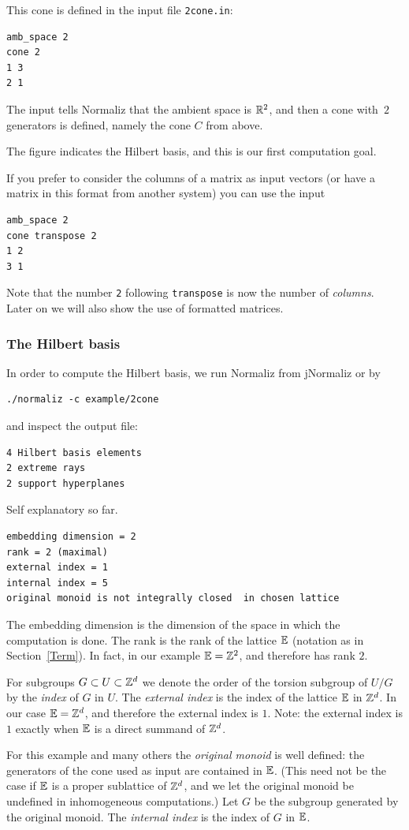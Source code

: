 This cone is defined in the input file \verb|2cone.in|:
\begin{Verbatim}
amb_space 2
cone 2
1 3
2 1
\end{Verbatim}
The input tells Normaliz that the ambient space is ${\mathbb R}^2$, and then a cone with~$2$ generators is defined, namely the cone $C$ from above.

The figure indicates the Hilbert basis, and this is our first computation goal.

If you prefer to consider the columns of a matrix as input vectors (or have a matrix in this format from another system) you can use the input
\begin{Verbatim}
amb_space 2
cone transpose 2
1 2
3 1
\end{Verbatim}
Note that the number \verb|2| following \verb|transpose| is now the number of \emph{columns}. Later on we will also show the use of formatted matrices.

\subsubsection{The Hilbert basis}
In order to compute the Hilbert basis, we run Normaliz from jNormaliz or by
\begin{Verbatim}
./normaliz -c example/2cone
\end{Verbatim}
and inspect the output file:
\begin{Verbatim}
4 Hilbert basis elements
2 extreme rays
2 support hyperplanes
\end{Verbatim}
Self explanatory so far.
\begin{Verbatim}
embedding dimension = 2
rank = 2 (maximal)
external index = 1
internal index = 5
original monoid is not integrally closed  in chosen lattice
\end{Verbatim}
The embedding dimension is the dimension of the space in which the computation is done. The rank is the rank of the lattice ${\mathbb E}$ (notation as in Section~\ref{Term}). In fact, in our example ${\mathbb E}={\mathbb Z}^2$, and therefore has rank $2$.

For subgroups $G\subset U\subset {\mathbb Z}^d$ we denote the order of the torsion subgroup of $U/G$ by the \emph{index} of $G$ in $U$. The \emph{external index} is the index of the lattice ${\mathbb E}$ in ${\mathbb Z}^d$. In our case ${\mathbb E}={\mathbb Z}^d$, and therefore the external index is $1$. Note: the external index is $1$ exactly when ${\mathbb E}$ is a direct summand of ${\mathbb Z}^d$.

For this example and many others the \emph{original monoid} is well defined: the generators of the cone used as input are contained in ${\mathbb E}$. (This need not be the case if ${\mathbb E}$ is a proper sublattice of ${\mathbb Z}^d$, and we let the original monoid be undefined in inhomogeneous computations.) Let $G$ be the subgroup generated by the original monoid. The \emph{internal index} is the index of $G$ in ${\mathbb E}$.

